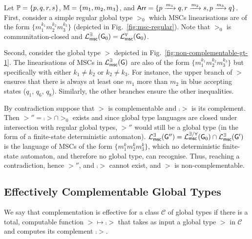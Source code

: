 \begin{example}\label{ex:non-complementable-gt}
    Let $\Procs=\{p,q,r,s\}$, $\Messages=\{m_1,m_2,m_3\}$, and 
    $\Arrows=\{\gtlabel{p}{q}{m_1},\gtlabel{r}{s}{m_2},\gtlabel{p}{q}{m_3}\}$.
    First, consider a simple regular global type $\gt_0$ which MSCs linearisations 
    are of the form 
    $\{m_1^{k_1}m_2^{k_2}m_3^{k_3}\}$ (depicted in Fig.~\ref{fig:msc-regular}). 
    Note that $\gt_0$ is communitation-closed and
    $\existentialmsclanguageof{\gt_0}=\universalmsclanguageof{\gt_0}$.

    Second, consider the global type $\gt$ depicted in 
    Fig.~\ref{fig:non-complementable-gt-1}. 
    The linearisations of MSCs in $\existentialmsclanguageof{\gt}$ are 
    also of the form $\{m_1^{k_1}m_2^{k_2}m_3^{k_3}\}$ but 
    specifically with either $k_1\neq k_2$ or $k_2\neq k_3$.
    For instance, the upper branch of $\gt$ ensures that there is always at 
    least one $m_1$ more than $m_2$ in blue accepting states ($q_1$, $q_6$, $q_8$). 
    Similarly, the other branches ensure the other inequalities. 

    By contradiction suppose that  $\gt$ is complementable and  $\comp{\gt}$ is  its complement.
   Then $\gt''=\comp{\gt}\cap\gt_0$ exists and 
    since global type languages are closed under intersection with regular global types,
    $\gt''$ would still be a global type (in the form of a finite-state deterministic automaton).
    $\existentialmsclanguageof{\gt''}=\msclanguageofcc{\gt_0}{}\cap\existentialmsclanguageof{\gt'}$ 
    is the language of MSCs of the form %
    $\{m_1^km_2^km_3^k\}$,  
    which no deterministic finite-state automaton, and therefore no global type, can recognise. 
    Thus, reaching a contradiction, hence $\gt''$, and $\comp{\gt}$ cannot exist, and $\gt$ is non-complementable.
\end{example}

\subsection{Effectively Complementable Global Types}

We say that complementation is effective for a class $\mathcal C$ of global types if 
there is a total, computable function $\gt \mapsto \comp{\gt}$ 
that takes as input a global type $\gt$ in $\mathcal C$ and computes its complement $\comp{\gt}$.


